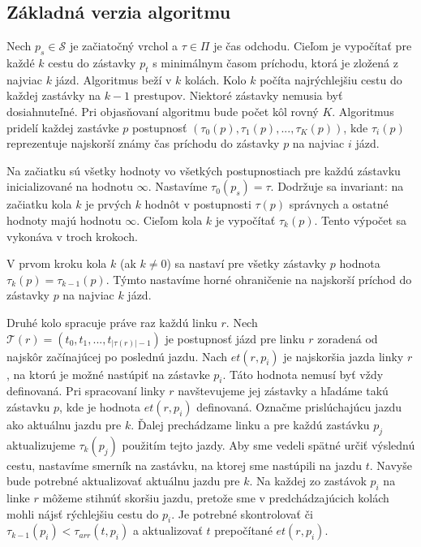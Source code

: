 \subsection{Základná verzia algoritmu}

Nech $p_s \in \mathcal{S}$ je začiatočný vrchol a $\tau \in \Pi$ je čas odchodu. Cieľom je vypočítať pre každé $k$ cestu do zástavky $p_t$ s minimálnym časom príchodu, ktorá je zložená z najviac $k$ jázd. Algoritmus beží v $k$ kolách. Kolo $k$ počíta najrýchlejšiu cestu do každej zastávky na $k-1$ prestupov. Niektoré zástavky nemusia byť dosiahnuteľné. Pri objasňovaní algoritmu bude počet kôl rovný $K$. Algoritmus pridelí každej zastávke $p$ postupnosť $(\tau_0(p), \tau_1(p), ..., \tau_K(p))$, kde $\tau_i(p)$ reprezentuje najskorší známy čas príchodu do zástavky $p$ na najviac $i$ jázd. 

Na začiatku sú všetky hodnoty vo všetkých postupnostiach pre každú zástavku inicializované na hodnotu $\infty$. Nastavíme $\tau_0(p_s) = \tau$. Dodržuje sa invariant: na začiatku kola $k$ je prvých $k$ hodnôt v postupnosti $\tau(p)$ správnych a ostatné hodnoty majú hodnotu $\infty$. Cieľom kola $k$ je vypočítať $\tau_k(p)$. Tento výpočet sa vykonáva v troch krokoch. 
 
V prvom kroku kola $k$ (ak $k \neq 0$) sa nastaví pre všetky zástavky $p$ hodnota $\tau_k(p) = \tau_{k-1}(p)$. Týmto nastavíme horné ohraničenie na najskorší príchod do zástavky $p$ na najviac $k$ jázd.

Druhé kolo spracuje práve raz každú linku $r$. Nech $\mathcal{T}(r) = (t_0, t_1, ..., t_{|\tau(r)|-1})$ je postupnosť jázd pre linku $r$ zoradená od najskôr začínajúcej po poslednú jazdu. Nach $et(r, p_i)$ je najskoršia jazda linky $r$, na ktorú je možné nastúpiť na zástavke $p_i$. Táto hodnota nemusí byť vždy definovaná. Pri spracovaní linky $r$ navštevujeme jej zástavky a hľadáme takú zástavku $p$, kde je hodnota $et(r, p_i)$ definovaná. Označme prislúchajúcu jazdu ako aktuálnu jazdu pre $k$. Ďalej prechádzame linku a pre každú zastávku $p_j$ aktualizujeme $\tau_k(p_j)$ použitím tejto jazdy. Aby sme vedeli spätné určiť výslednú cestu, nastavíme smerník na zastávku, na ktorej sme nastúpili na jazdu $t$. Navyše bude potrebné aktualizovať aktuálnu jazdu pre $k$. Na každej zo zastávok $p_i$ na linke $r$ môžeme stihnúť skoršiu jazdu, pretože sme v predchádzajúcich kolách mohli nájsť rýchlejšiu cestu do $p_i$. Je potrebné skontrolovať či $\tau_{k-1}(p_i) < \tau_{arr}(t, p_i)$ a aktualizovať $t$ prepočítané $et(r, p_i)$.


